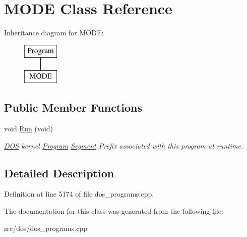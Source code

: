\hypertarget{classMODE}{\section{M\-O\-D\-E Class Reference}
\label{classMODE}
}
Inheritance diagram for M\-O\-D\-E\-:\begin{figure}[H]
\begin{center}
\leavevmode
\includegraphics[height=2.000000cm]{classMODE}
\end{center}
\end{figure}
\subsection*{Public Member Functions}
\begin{DoxyCompactItemize}
\item 
\hypertarget{classMODE_ae1eafc4abaabb5f647bff778f0e78215}{void \hyperlink{classMODE_ae1eafc4abaabb5f647bff778f0e78215}{Run} (void)}\label{classMODE_ae1eafc4abaabb5f647bff778f0e78215}

\begin{DoxyCompactList}\small\item\em \hyperlink{classDOS}{D\-O\-S} kernel \hyperlink{classProgram}{Program} \hyperlink{structSegment}{Segment} Prefix associated with this program at runtime. \end{DoxyCompactList}\end{DoxyCompactItemize}


\subsection{Detailed Description}


Definition at line 5174 of file dos\-\_\-programs.\-cpp.



The documentation for this class was generated from the following file\-:\begin{DoxyCompactItemize}
\item 
src/dos/dos\-\_\-programs.\-cpp\end{DoxyCompactItemize}
